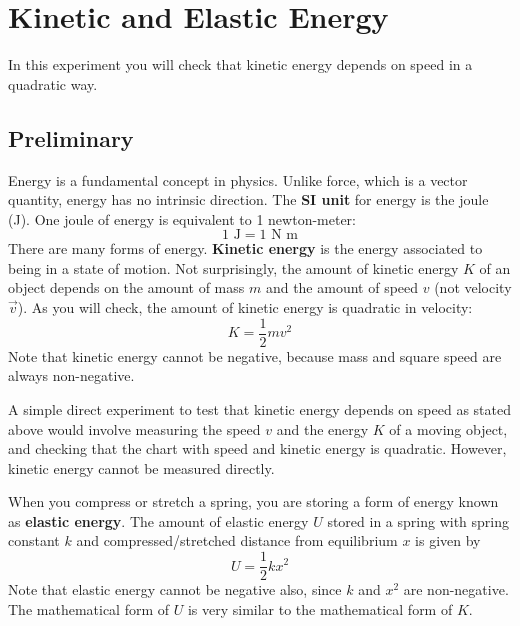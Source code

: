 \setcounter{chapter}{6}
\chapter{Kinetic and Elastic Energy}
In this experiment you will check that kinetic energy depends on speed in a quadratic way.
\section{Preliminary}
Energy is a fundamental concept in physics. Unlike force, which is a vector quantity, energy has no intrinsic direction. The \textbf{SI unit} for energy is the joule (J). One joule of energy is equivalent to 1 newton-meter:
\begin{equation}
    1 \text{ J} = 1 \text{ N m}
\end{equation}
There are many forms of energy. \textbf{Kinetic energy} is the energy associated to being in a state of motion. Not surprisingly, the amount of kinetic energy $K$ of an object depends on the amount of mass $m$ and the amount of speed $v$ (not velocity $\vec{v}$). As you will check, the amount of kinetic energy is quadratic in velocity:
\begin{equation}
    K = \frac{1}{2} m v^{2}
\end{equation}
Note that kinetic energy cannot be negative, because mass and square speed are always non-negative.

A simple direct experiment to test that kinetic energy depends on speed as stated above would involve measuring the speed $v$ and the energy $K$ of a moving object, and checking that the chart with speed and kinetic energy is quadratic. However, kinetic energy cannot be measured directly.

When you compress or stretch a spring, you are storing a form of energy known as \textbf{elastic energy}. The amount of elastic energy $U$ stored in a spring with spring constant $k$ and compressed/stretched distance from equilibrium $x$ is given by
\begin{equation}
    U = \frac{1}{2} k x^{2}
\end{equation}
Note that elastic energy cannot be negative also, since $k$ and $x^{2}$ are non-negative. The mathematical form of $U$ is very similar to the mathematical form of $K$.

